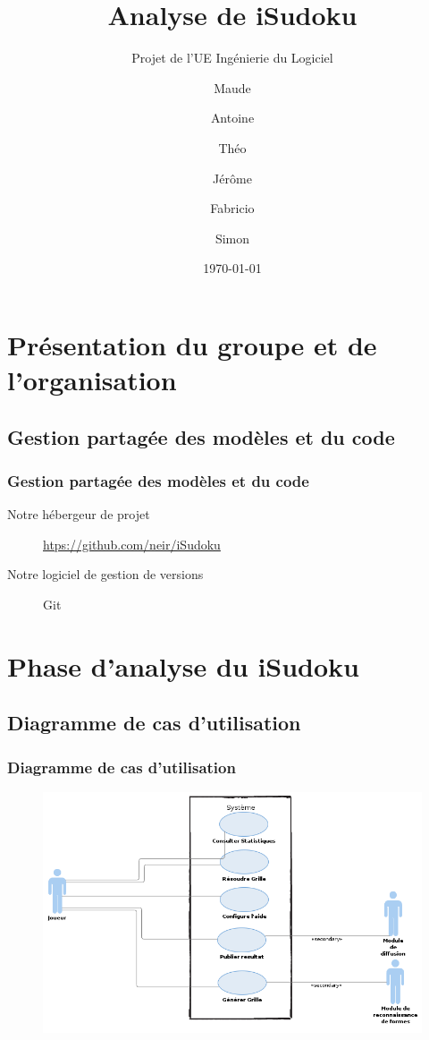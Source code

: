 \documentclass{beamer}
\title[Analyse de iSudoku]{Analyse de iSudoku}
\subtitle[\ldots]{Projet de l'UE Ingénierie du Logiciel}
\author{
  Maude \bsc{Bel}
  \and
  Antoine \bsc{Houssais}
  \and
  Théo \bsc{Lebourg}
  \and
  Jérôme \bsc{Rahault}
  \and
  Fabricio \bsc{Santolin Da Silva}
  \and
  Simon \bsc{Tchernia}
}
\institute{Université Pierre et Marie Curie}
\date{\today}
\begin{document}
\maketitle

\section{Présentation du groupe et de l’organisation}
\subsection{Gestion partagée des modèles et du code}
\begin{frame}
  \frametitle{Gestion partagée des modèles et du code}
  \begin{description}
    \item [Notre hébergeur de projet] \url{htps://github.com/neir/iSudoku}
      \pause
    \item [Notre logiciel de gestion de versions] Git
\end{description}
\end{frame}
\section{Phase d’analyse du iSudoku}
\subsection{Diagramme de cas d’utilisation}
\begin{frame}
\frametitle{Diagramme de cas d'utilisation}
\begin{figure}[h]
  \includegraphics[scale=0.4]{diagrammeCasDUtilisation.png}
\end{figure}
\end{frame}
\end{document}
